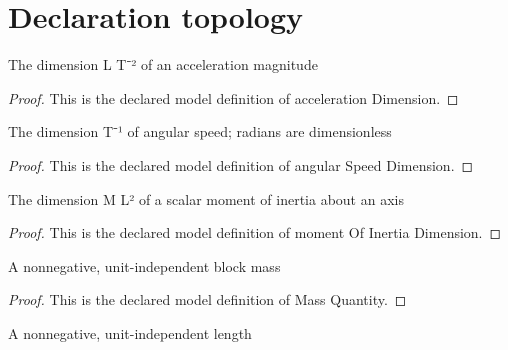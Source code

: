 \section{Declaration topology}
\begin{definition}
  \label{def:physics:phyx-mini-0774:phyxminiproblems-problemphyxmini0774-accelerationdimension}
  The dimension L T⁻² of an acceleration magnitude
\end{definition}
\begin{proof}
  This is the declared model definition of acceleration Dimension.
\end{proof}
\begin{definition}
  \label{def:physics:phyx-mini-0774:phyxminiproblems-problemphyxmini0774-angularspeeddimension}
  The dimension T⁻¹ of angular speed; radians are dimensionless
\end{definition}
\begin{proof}
  This is the declared model definition of angular Speed Dimension.
\end{proof}
\begin{definition}
  \label{def:physics:phyx-mini-0774:phyxminiproblems-problemphyxmini0774-momentofinertiadimension}
  The dimension M L² of a scalar moment of inertia about an axis
\end{definition}
\begin{proof}
  This is the declared model definition of moment Of Inertia Dimension.
\end{proof}
\begin{definition}
  \label{def:physics:phyx-mini-0774:phyxminiproblems-problemphyxmini0774-massquantity}
  A nonnegative, unit-independent block mass
\end{definition}
\begin{proof}
  This is the declared model definition of Mass Quantity.
\end{proof}
\begin{definition}
  \label{def:physics:phyx-mini-0774:phyxminiproblems-problemphyxmini0774-lengthquantity}
  A nonnegative, unit-independent length
\end{definition}
